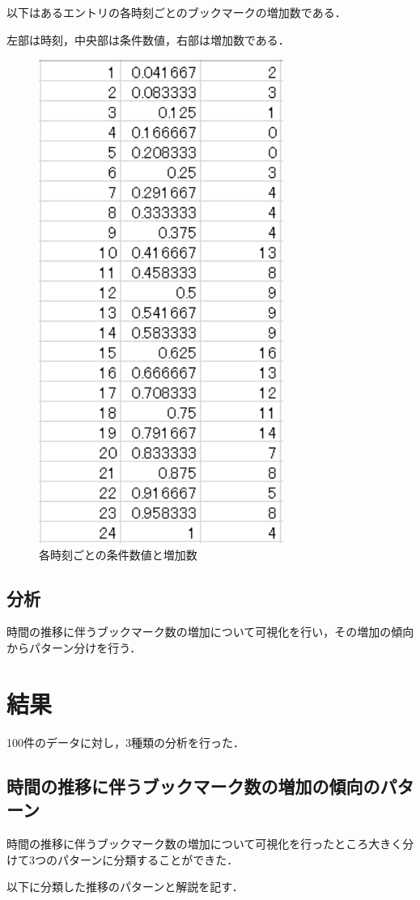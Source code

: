 以下はあるエントリの各時刻ごとのブックマークの増加数である．\par
左部は時刻，中央部は条件数値，右部は増加数である．

\begin{figure}[htb]
\centering
\includegraphics[width=8cm]{excel7.PNG}
\caption{各時刻ごとの条件数値と増加数}\label{excel7}
\end{figure}


\section{分析}
時間の推移に伴うブックマーク数の増加について可視化を行い，その増加の傾向からパターン分けを行う．\par


\chapter{結果}
100件のデータに対し，3種類の分析を行った．
\section{時間の推移に伴うブックマーク数の増加の傾向のパターン}
時間の推移に伴うブックマーク数の増加について可視化を行ったところ大きく分けて3つのパターンに分類することができた．\par
以下に分類した推移のパターンと解説を記す．

